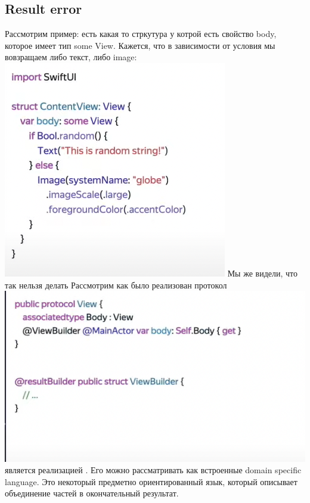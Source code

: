 \documentclass{article}
\begin{document}
    \subsection{Result error}
    Рассмотрим пример: есть какая то стркутура у котрой есть свойство body, которое имеет тип some View.
    \newline
    Кажется, что в зависимости от условия мы вовзращаем либо текст, либо image: 
    \newline
    \includegraphics[scale = 0.5]{pic/Снимок экрана 2023-07-28 в 23.47.11.png}
    \newline
    Мы же видели, что так нельзя делать
    \newline
    Рассмотрим как было реализован протокол 
    \newline
    \includegraphics[scale = 0.5]{pic/Снимок экрана 2023-07-28 в 23.48.02.png}
    \newline
     является реализацией . Его можно рассматривать как встроенные domain specific language. Это некоторый предметно ориентированный язык, который описывает объединение частей в окончательный результат. 
\end{document}
